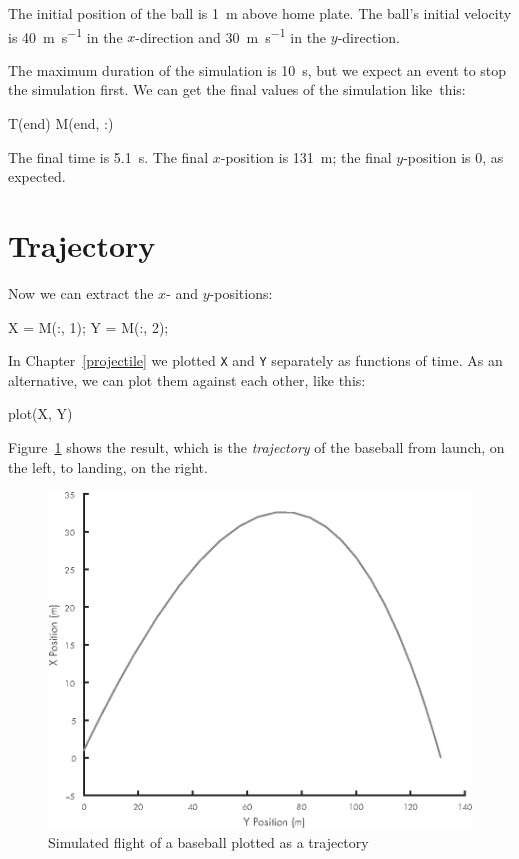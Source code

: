 The initial position of the ball is \SI{1}{\meter} above home plate.  The ball's initial velocity is \SI{40}{\meter\per\second} in the $x$-direction and \SI{30}{\meter\per\second} in the $y$-direction.


The maximum duration of the simulation is \SI{10}{\second}, but we expect an event to stop the simulation first.  We can get the final values of the simulation like~this:

\begin{code}
    T(end)
    M(end, :)
\end{code}

The final time is \SI{5.1}{\second}.  The final $x$-position is \SI{131}{\meter}; the final $y$-position is 0, as expected.


\section{Trajectory}

Now we can extract the $x$- and $y$-positions:

\begin{code}
    X = M(:, 1);
    Y = M(:, 2);
\end{code}

In Chapter~\ref{projectile} we plotted \lstinline{X} and \lstinline{Y} separately as functions of time.  As an alternative, we can plot them against each other, like this:

\begin{code}
    plot(X, Y)
\end{code}


Figure~\ref{fig:baseball3} shows the result, which is the \emph{trajectory} of the baseball from launch, on the left, to landing, on the right.

\begin{figure}[h]
\centerline{\includegraphics[scale=0.8]{images/figure13_01_new.eps}}
\caption{Simulated flight of a baseball plotted as a trajectory}
\label{fig:baseball3}
\end{figure}

